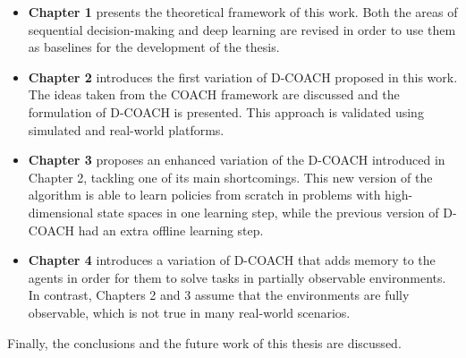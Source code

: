 \begin{intro}
\begin{itemize}
    \item \textbf{Chapter 1} presents the theoretical framework of this work. Both the areas of sequential decision-making and deep learning are revised in order to use them as baselines for the development of the thesis.
    \item \textbf{Chapter 2} introduces the first variation of D-COACH proposed in this work. The ideas taken from the COACH framework are discussed and the formulation of D-COACH is presented. This approach is validated using simulated and real-world platforms.
    \item \textbf{Chapter 3} proposes an enhanced variation of the D-COACH introduced in Chapter 2, tackling one of its main shortcomings. This new version of the algorithm is able to learn policies from scratch in problems with high-dimensional state spaces in one learning step, while the previous version of D-COACH had an extra offline learning step.
    \item \textbf{Chapter 4} introduces a variation of D-COACH that adds memory to the agents in order for them to solve tasks in partially observable environments. In contrast, Chapters 2 and 3 assume that the environments are fully observable, which is not true in many real-world scenarios.
\end{itemize}

Finally, the conclusions and the future work of this thesis are discussed. 

\end{intro}